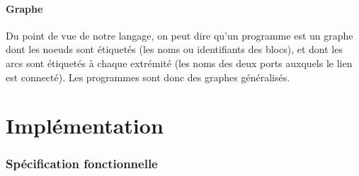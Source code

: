 \documentclass{article}
\begin{document}
\subsection{Graphe}
Du point de vue de notre langage, on peut dire qu'un programme est un graphe dont les noeuds sont étiquetés (les noms ou identifiants des blocs), et dont les arcs sont étiquetés à chaque extrémité (les noms des deux ports auxquels le lien est connecté). Les programmes sont donc des graphes généralisés.




\part{Implémentation}

\section{Spécification fonctionnelle}



\appendix

\nocite{*}




\long{}
\end{document}
